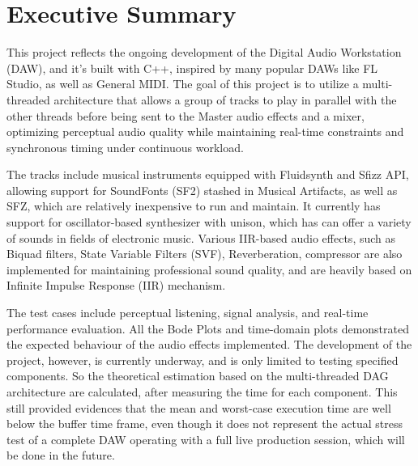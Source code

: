 \section*{Executive Summary}

This project reflects the ongoing development of the Digital Audio Workstation (DAW),
and it's built with C++, inspired by many popular DAWs like FL Studio, as well as
General MIDI. The goal of this project is to utilize a multi-threaded architecture that allows a group of
tracks to play in parallel with the other threads before being sent to the Master audio
effects and a mixer, optimizing perceptual audio quality while maintaining real-time constraints and synchronous timing under 
continuous workload.

The tracks include musical instruments equipped with Fluidsynth and Sfizz API,
allowing support for SoundFonts (SF2) stashed in Musical Artifacts, as well as SFZ, which are relatively
inexpensive to run and maintain. It currently has support for oscillator-based synthesizer with unison, which has
can offer a variety of sounds in fields of electronic music. Various IIR-based audio effects, such as
Biquad filters, State Variable Filters (SVF), Reverberation, compressor are also implemented for maintaining
professional sound quality, and are heavily based on Infinite Impulse Response (IIR) mechanism.

The test cases include perceptual listening, signal analysis, and real-time performance evaluation. 
All the Bode Plots and time-domain plots demonstrated the expected behaviour of the audio effects implemented. 
The development of the project, however, is currently underway, and is only limited to testing specified components.
So the theoretical estimation based on the multi-threaded DAG architecture are calculated, after 
measuring the time for each component. This still provided evidences that the mean and worst-case execution time
are well below the buffer time frame, even though it does not represent the actual stress test of a complete DAW 
operating with a full live production session, which will be done in the future.
